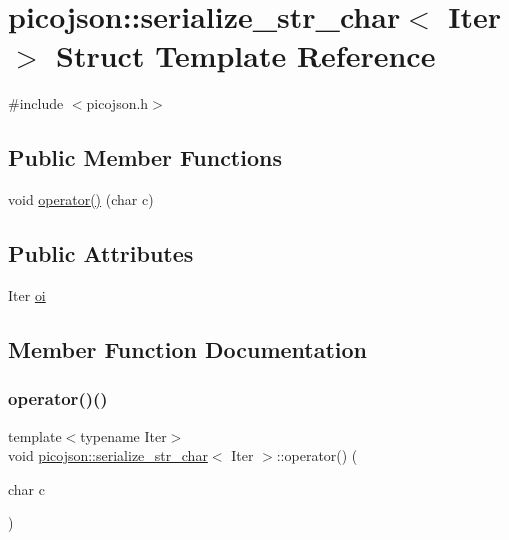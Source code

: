 \hypertarget{structpicojson_1_1serialize__str__char}{}\section{picojson\+:\+:serialize\+\_\+str\+\_\+char$<$ Iter $>$ Struct Template Reference}
\label{structpicojson_1_1serialize__str__char}


{\ttfamily \#include $<$picojson.\+h$>$}

\subsection*{Public Member Functions}
\begin{DoxyCompactItemize}
\item 
void \hyperlink{structpicojson_1_1serialize__str__char_acea559bf2510abf0c3735b02e080308f}{operator()} (char c)
\end{DoxyCompactItemize}
\subsection*{Public Attributes}
\begin{DoxyCompactItemize}
\item 
Iter \hyperlink{structpicojson_1_1serialize__str__char_a1abb88801c571a903ef9e3a21388b944}{oi}
\end{DoxyCompactItemize}


\subsection{Member Function Documentation}
\hypertarget{structpicojson_1_1serialize__str__char_acea559bf2510abf0c3735b02e080308f}{}\label{structpicojson_1_1serialize__str__char_acea559bf2510abf0c3735b02e080308f} 
\subsubsection{\texorpdfstring{operator()()}{operator()()}}
{\footnotesize\ttfamily template$<$typename Iter$>$ \\
void \hyperlink{structpicojson_1_1serialize__str__char}{picojson\+::serialize\+\_\+str\+\_\+char}$<$ Iter $>$\+::operator() (\begin{DoxyParamCaption}\item[{char}]{c }\end{DoxyParamCaption})\hspace{0.3cm}{\ttfamily [inline]}}

